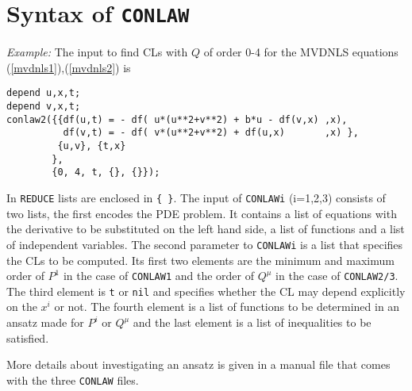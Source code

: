 \section{Syntax of {\tt CONLAW}}
\noindent
{\it Example:} The input to find CLs with $Q$ of order 0-4 for the MVDNLS
equations (\ref{mvdnls1}),(\ref{mvdnls2}) is
\begin{verbatim}
depend u,x,t;
depend v,x,t;
conlaw2({{df(u,t) = - df( u*(u**2+v**2) + b*u - df(v,x) ,x),
          df(v,t) = - df( v*(u**2+v**2) + df(u,x)       ,x) }, 
         {u,v}, {t,x}
        },
        {0, 4, t, {}, {}});
\end{verbatim}
In {\tt REDUCE} lists are enclosed in \verb+{ }+.
The input of {\tt CONLAWi} (i=1,2,3) consists of two lists, the first
encodes the PDE problem. It contains a list of equations with the derivative to
be substituted on the left hand side, a list of functions and a list of
independent variables. The second parameter to {\tt CONLAWi} is a list
that specifies the CLs to be computed. Its first two elements are the 
minimum and maximum order of $P^1$ in the case of {\tt CONLAW1} and the
order of $Q^{\mu}$ in the case of {\tt CONLAW2/3}. The third element is
{\tt t} or {\tt nil} and specifies whether the CL may depend explicitly
on the $x^i$ or not. The fourth element is a list of functions to be
determined in an ansatz made for $P^i$ or $Q^{\mu}$ and the last element
is a list of inequalities to be satisfied.

More details about investigating an ansatz is given in a manual file
that comes with the three {\tt CONLAW} files.

